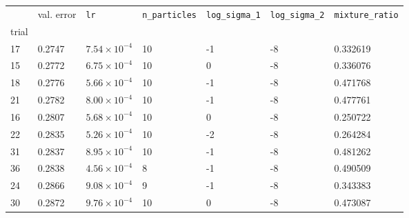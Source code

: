 \begin{tabular}{lp{2.3cm}p{2.3cm}p{2.3cm}p{2.3cm}p{2.3cm}p{2.3cm}}
\toprule
{} &  val. error &         \texttt{lr} &  \texttt{n\_particles} &  \texttt{log\_sigma\_1} &  \texttt{log\_sigma\_2} &  \texttt{mixture\_ratio} \\
trial &             &                     &                        &                         &                         &                          \\
\midrule
17    &      0.2747 & $7.54\times10^{-4}$ &                     10 &                      -1 &                      -8 &                 0.332619 \\
15    &      0.2772 & $6.75\times10^{-4}$ &                     10 &                       0 &                      -8 &                 0.336076 \\
18    &      0.2776 & $5.66\times10^{-4}$ &                     10 &                      -1 &                      -8 &                 0.471768 \\
21    &      0.2782 & $8.00\times10^{-4}$ &                     10 &                      -1 &                      -8 &                 0.477761 \\
16    &      0.2807 & $5.68\times10^{-4}$ &                     10 &                       0 &                      -8 &                 0.250722 \\
22    &      0.2835 & $5.26\times10^{-4}$ &                     10 &                      -2 &                      -8 &                 0.264284 \\
31    &      0.2837 & $8.95\times10^{-4}$ &                     10 &                      -1 &                      -8 &                 0.481262 \\
36    &      0.2838 & $4.56\times10^{-4}$ &                      8 &                      -1 &                      -8 &                 0.490509 \\
24    &      0.2866 & $9.08\times10^{-4}$ &                      9 &                      -1 &                      -8 &                 0.343383 \\
30    &      0.2872 & $9.76\times10^{-4}$ &                     10 &                       0 &                      -8 &                 0.473087 \\
\bottomrule
\end{tabular}
